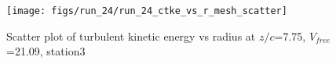 \begin{figure}[H]
\centering
\texttt{[image: figs/run\_24/run\_24\_ctke\_vs\_r\_mesh\_scatter]}
\caption{Scatter plot of turbulent kinetic energy vs radius at $z/c$=7.75, $V_{free}$=21.09, station3}
\label{fig:run_24_ctke_vs_r_mesh_scatter}
\end{figure}


